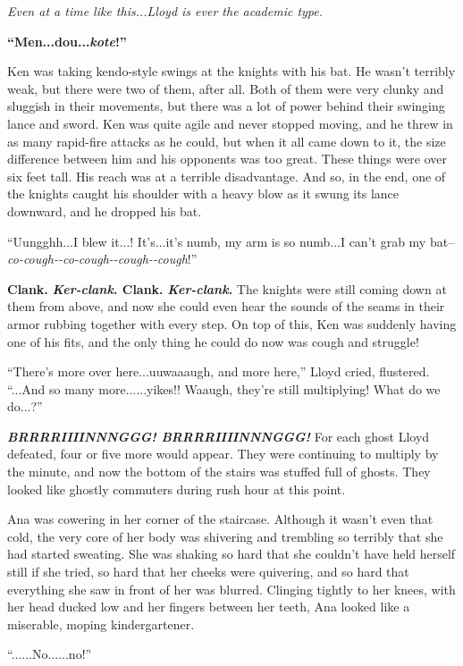\documentclass[
]{article}
\begin{document}
\emph{Even at a time like this...Lloyd is ever the academic type.}

\textbf{``Men...dou...}\emph{\textbf{kote}}\textbf{!''}

\textbf{}Ken was taking kendo-style swings at the knights with his bat.
He wasn't terribly weak, but there were two of them, after all. Both of
them were very clunky and sluggish in their movements, but there was a
lot of power behind their swinging lance and sword. Ken was quite agile
and never stopped moving, and he threw in as many rapid-fire attacks as
he could, but when it all came down to it, the size difference between
him and his opponents was too great. These things were over six feet
tall. His reach was at a terrible disadvantage. And so, in the end, one
of the knights caught his shoulder with a heavy blow as it swung its
lance downward, and he dropped his bat.

``Uungghh...I blew it...! It's...it's numb, my arm is so numb...I can't
grab my bat--\emph{co-cough-\/-co-cough-\/-cough-\/-cough}!''

\textbf{Clank. }\emph{\textbf{Ker-clank}}\textbf{. Clank.
}\emph{\textbf{Ker-clank}}\textbf{.} The knights were still coming down
at them from above, and now she could even hear the sounds of the seams
in their armor rubbing together with every step. On top of this, Ken was
suddenly having one of his fits, and the only thing he could do now was
cough and struggle!

``There's more over here...uuwaaaugh, and more here,'' Lloyd cried,
flustered. ``...And so many more......yikes!! Waaugh, they're still
multiplying! What do we do...?''

\emph{\textbf{BRRRRIIIINNNGGG! BRRRRIIIINNNGGG!}} For each ghost Lloyd
defeated, four or five more would appear. They were continuing to
multiply by the minute, and now the bottom of the stairs was stuffed
full of ghosts. They looked like ghostly commuters during rush hour at
this point.

Ana was cowering in her corner of the staircase. Although it wasn't even
that cold, the very core of her body was shivering and trembling so
terribly that she had started sweating. She was shaking so hard that she
couldn't have held herself still if she tried, so hard that her cheeks
were quivering, and so hard that everything she saw in front of her was
blurred. Clinging tightly to her knees, with her head ducked low and her
fingers between her teeth, Ana looked like a miserable, moping
kindergartener.

``......No......no!''
\end{document}
